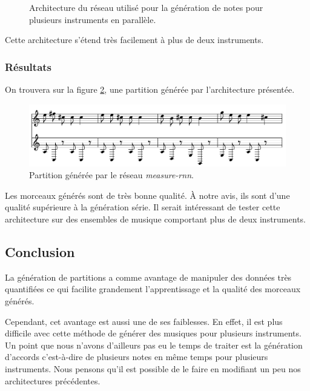 \begin{figure}[h!]
\begin{center}

\caption{Architecture du réseau utilisé pour la génération de notes pour plusieurs instruments en parallèle.}
\label{measure_rnn}
\end{center}
\end{figure}

Cette architecture s'étend très facilement à plus de deux instruments.

\subsubsection{Résultats}

On trouvera sur la figure \ref{result_measure_rnn}, une partition générée par l'architecture présentée.

\begin{figure}[h!]
\begin{center}
\includegraphics[scale=0.3]{images/chapter9/measure_rnn_result.png}
\caption{Partition générée par le réseau \textit{measure-rnn}.}
\label{result_measure_rnn}
\end{center}
\end{figure}

Les morceaux générés sont de très bonne qualité. À notre avis, ils sont d'une qualité supérieure à la génération série. Il serait intéressant de tester cette architecture sur des ensembles de musique comportant plus de deux instruments.

\subsection{Conclusion}

La génération de partitions a comme avantage de manipuler des données très quantifiées ce qui facilite grandement l'apprentissage et la qualité des morceaux générés.

Cependant, cet avantage est aussi une de ses faiblesses. En effet, il est plus difficile avec cette méthode de générer des musiques pour plusieurs instruments. Un point que nous n'avons d'ailleurs pas eu le temps de traiter est la génération d'accords c'est-à-dire de plusieurs notes en même temps pour plusieurs instruments. Nous pensons qu'il est possible de le faire en modifiant un peu nos architectures précédentes.

